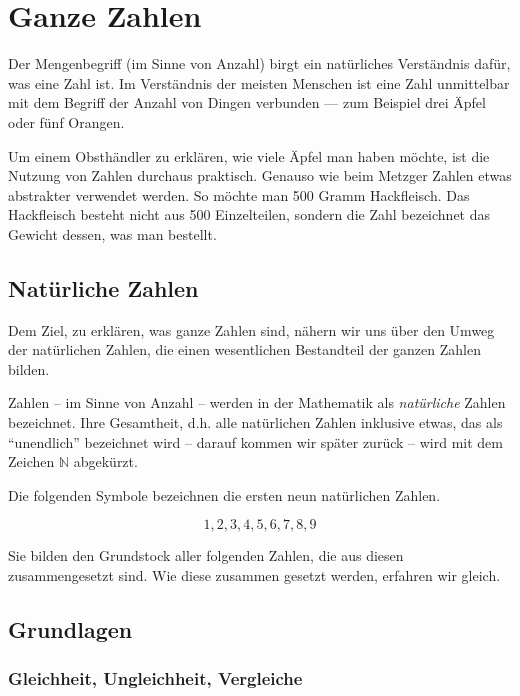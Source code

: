\chapter{Ganze Zahlen}

Der Mengenbegriff (im Sinne von Anzahl) birgt ein natürliches Verständnis dafür, was eine Zahl ist. Im Verständnis der meisten Menschen ist eine Zahl unmittelbar mit dem Begriff der Anzahl von Dingen verbunden --- zum Beispiel drei Äpfel oder fünf Orangen.

Um einem Obsthändler zu erklären, wie viele Äpfel man haben möchte, ist die Nutzung von Zahlen durchaus praktisch. Genauso wie beim Metzger Zahlen etwas abstrakter verwendet werden. So möchte man 500 Gramm Hackfleisch. Das Hackfleisch besteht nicht aus 500 Einzelteilen, sondern die Zahl bezeichnet das Gewicht dessen, was man bestellt.

\section{Natürliche Zahlen}

Dem Ziel, zu erklären, was ganze Zahlen sind, nähern wir uns über den Umweg der natürlichen Zahlen, die einen wesentlichen Bestandteil der ganzen Zahlen bilden. 


\begin{definition}
Zahlen -- im Sinne von Anzahl -- werden in der Mathematik als \emph{natürliche} Zahlen bezeichnet. Ihre Gesamtheit, d.h. alle natürlichen Zahlen inklusive etwas, das als "`unendlich"' bezeichnet wird -- darauf kommen wir später zurück -- wird mit dem Zeichen $\mathbb{N}$  abgekürzt.
\end{definition}

Die folgenden Symbole bezeichnen die ersten neun natürlichen Zahlen. 

\[ 
1, 2, 3, 4, 5, 6, 7, 8, 9
\]

Sie bilden den Grundstock aller folgenden Zahlen, die aus diesen zusammengesetzt sind. Wie diese zusammen gesetzt werden, erfahren wir gleich.

\section{Grundlagen}

\subsection{Gleichheit, Ungleichheit, Vergleiche}

